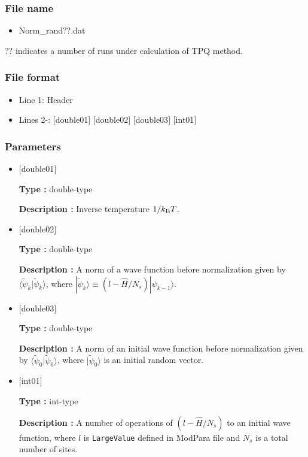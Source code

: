 \subsubsection{File name}
 \begin{itemize}
   \item Norm\_rand??.dat
  \end{itemize}
  ?? indicates a number of runs under calculation of TPQ method.

\subsubsection{File format}
 \begin{itemize}
   \item Line 1: Header
   \item Lines 2-: $[$double01$]$ $[$double02$]$ $[$double03$]$ $[$int01$]$
  \end{itemize}
\subsubsection{Parameters}
 \begin{itemize}

  \item  $[$double01$]$
  
 {\bf Type :} double-type

{\bf Description :}  Inverse temperature $1/{k_{\rm B}T}$.
 
  \item $[$double02$]$

 {\bf Type :} double-type 

{\bf Description :}  A norm of a wave function before normalization 
given by $\langle \tilde{\psi}_{k} |\tilde{\psi}_{k}\rangle$, where $|\tilde{\psi}_{k}\rangle \equiv(l-\hat{H}/N_{s})|\psi_{k-1}\rangle$.


  \item $[$double03$]$

 {\bf Type :} double-type 

{\bf Description :} A norm of an initial wave function before normalization 
given by $\langle \tilde{\psi}_{0} |\tilde{\psi}_{0}\rangle$, where $|\tilde{\psi}_{0}\rangle$ is an initial random vector.

  \item $[$int01$]$

 {\bf Type :} int-type 

{\bf Description :} A number of operations of $(l-\hat{H}/N_{s})$ to an initial wave function, where $l$ is \verb|LargeValue| defined in ModPara file and $N_{s}$ is a total number of sites.

 \end{itemize}


